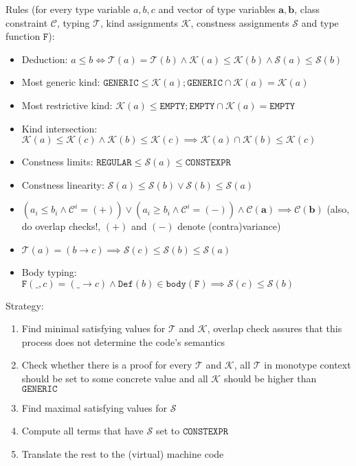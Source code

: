 \documentclass[12pt,a4paper]{article}
\begin{document}
Rules (for every type variable $a, b, c$ and vector of type variables $\mathbf{a}, \mathbf{b}$, class constraint $\mathcal{C}$, typing $\mathcal{T}$, kind assignments $\mathcal{K}$, constness assignments $\mathcal{S}$ and type function $\texttt{F}$):
\begin{itemize}
    \item Deduction: $a \leq b \iff \mathcal{T}(a) = \mathcal{T}(b) \land \mathcal{K}(a) \leq \mathcal{K}(b) \land \mathcal{S}(a) \leq \mathcal{S}(b)$
    \item Most generic kind: $\mathtt{GENERIC} \leq \mathcal{K}(a); \mathtt{GENERIC} \cap \mathcal{K}(a) = \mathcal{K}(a)$
    \item Most restrictive kind: $\mathcal{K}(a) \leq \mathtt{EMPTY}; \mathtt{EMPTY} \cap \mathcal{K}(a) = \mathtt{EMPTY}$
    \item Kind intersection: $\mathcal{K}(a) \leq \mathcal{K}(c) \land \mathcal{K}(b) \leq \mathcal{K}(c) \implies \mathcal{K}(a) \cap \mathcal{K}(b) \leq \mathcal{K}(c)$
    \item Constness limits: $\mathtt{REGULAR} \leq \mathcal{S}(a) \leq \mathtt{CONSTEXPR}$
    \item Constness linearity: $\mathcal{S}(a) \leq \mathcal{S}(b) \lor \mathcal{S}(b) \leq \mathcal{S}(a)$
    \item $(a_i \leq b_i \land \mathcal{C}^i = (+)) \lor (a_i \geq b_i \land \mathcal{C}^i = (-)) \land \mathcal{C}(\mathbf{a}) \implies \mathcal{C}(\mathbf{b})$ (also, do overlap checks!, $(+)$ and $(-)$ denote (contra)variance)
    \item $\mathcal{T}(a) = (b \to c) \implies \mathcal{S}(c) \leq \mathcal{S}(b) \leq \mathcal{S}(a)$
    \item Body typing: $\mathtt{F}(\_, c) = (\_ \to c) \land \mathtt{Def}(b) \in \mathtt{body}(\mathtt{F}) \implies \mathcal{S}(c) \leq \mathcal{S}(b)$
\end{itemize}
\pagebreak

Strategy:
\begin{enumerate}
    \item Find minimal satisfying values for $\mathcal{T}$ and $\mathcal{K}$, overlap check assures that this process does not determine the code's semantics
    \item Check whether there is a proof for every $\mathcal{T}$ and $\mathcal{K}$, all $\mathcal{T}$ in monotype context should be set to some concrete value and all $\mathcal{K}$ should be higher than $\mathtt{GENERIC}$
    \item Find maximal satisfying values for $\mathcal{S}$
    \item Compute all terms that have $\mathcal{S}$ set to $\mathtt{CONSTEXPR}$
    \item Translate the rest to the (virtual) machine code
\end{enumerate}
\end{document}
